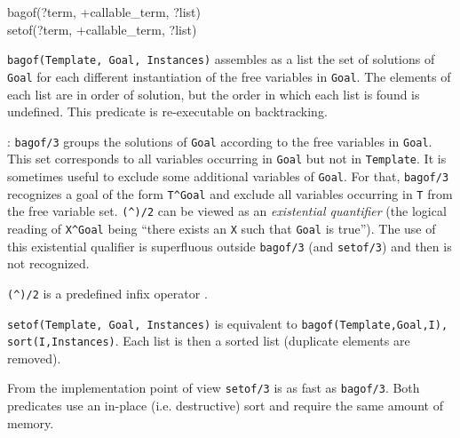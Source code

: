 \begin{TemplatesOneCol}
bagof(?term, +callable\_term, ?list)\\
setof(?term, +callable\_term, ?list)

\end{TemplatesOneCol}

\Description

\texttt{bagof(Template, Goal, Instances)} assembles as a list the
set of solutions of \texttt{Goal} for each different instantiation of the
free variables in \texttt{Goal}. The elements of each list are in order of
solution, but the order in which each list is found is undefined.
This predicate is re-executable on backtracking.

: \texttt{bagof/3} groups the solutions of
\texttt{Goal} according to the free variables in \texttt{Goal}. This set
corresponds to all variables occurring in \texttt{Goal} but not in
\texttt{Template}. It is sometimes useful to exclude some additional
variables of \texttt{Goal}. For that, \texttt{bagof/3} recognizes a goal of
the form \texttt{T\^{}Goal} and exclude all variables occurring in \texttt{T}
from the free variable set. \texttt{(\^{})/2} can be viewed as an
\emph{existential quantifier} (the logical reading of \texttt{X\^{}Goal}
being ``there exists an \texttt{X} such that \texttt{Goal} is true''). The
use of this existential qualifier is superfluous outside \texttt{bagof/3}
(and \texttt{setof/3}) and then is not recognized.

\texttt{(\^{})/2} is a predefined infix operator .

\texttt{setof(Template, Goal, Instances)} is equivalent to
\texttt{bagof(Template,Goal,I), sort(I,Instances)}. Each list is then a
sorted list (duplicate elements are removed).

From the implementation point of view \texttt{setof/3} is as fast as
\texttt{bagof/3}. Both predicates use an in-place (i.e. destructive) sort
 and require the same amount of memory.

\begin{PlErrors}





\end{PlErrors}

